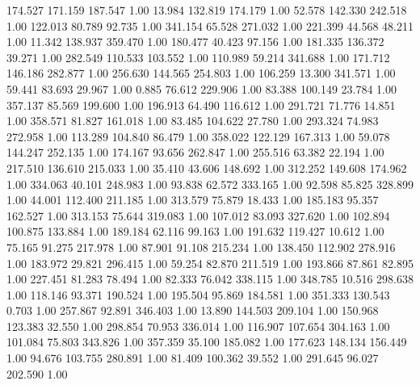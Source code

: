  174.527  171.159  187.547         1.00
  13.984  132.819  174.179         1.00
  52.578  142.330  242.518         1.00
 122.013   80.789   92.735         1.00
 341.154   65.528  271.032         1.00
 221.399   44.568   48.211         1.00
  11.342  138.937  359.470         1.00
 180.477   40.423   97.156         1.00
 181.335  136.372   39.271         1.00
 282.549  110.533  103.552         1.00
 110.989   59.214  341.688         1.00
 171.712  146.186  282.877         1.00
 256.630  144.565  254.803         1.00
 106.259   13.300  341.571         1.00
  59.441   83.693   29.967         1.00
   0.885   76.612  229.906         1.00
  83.388  100.149   23.784         1.00
 357.137   85.569  199.600         1.00
 196.913   64.490  116.612         1.00
 291.721   71.776   14.851         1.00
 358.571   81.827  161.018         1.00
  83.485  104.622   27.780         1.00
 293.324   74.983  272.958         1.00
 113.289  104.840   86.479         1.00
 358.022  122.129  167.313         1.00
  59.078  144.247  252.135         1.00
 174.167   93.656  262.847         1.00
 255.516   63.382   22.194         1.00
 217.510  136.610  215.033         1.00
  35.410   43.606  148.692         1.00
 312.252  149.608  174.962         1.00
 334.063   40.101  248.983         1.00
  93.838   62.572  333.165         1.00
  92.598   85.825  328.899         1.00
  44.001  112.400  211.185         1.00
 313.579   75.879   18.433         1.00
 185.183   95.357  162.527         1.00
 313.153   75.644  319.083         1.00
 107.012   83.093  327.620         1.00
 102.894  100.875  133.884         1.00
 189.184   62.116   99.163         1.00
 191.632  119.427   10.612         1.00
  75.165   91.275  217.978         1.00
  87.901   91.108  215.234         1.00
 138.450  112.902  278.916         1.00
 183.972   29.821  296.415         1.00
  59.254   82.870  211.519         1.00
 193.866   87.861   82.895         1.00
 227.451   81.283   78.494         1.00
  82.333   76.042  338.115         1.00
 348.785   10.516  298.638         1.00
 118.146   93.371  190.524         1.00
 195.504   95.869  184.581         1.00
 351.333  130.543    0.703         1.00
 257.867   92.891  346.403         1.00
  13.890  144.503  209.104         1.00
 150.968  123.383   32.550         1.00
 298.854   70.953  336.014         1.00
 116.907  107.654  304.163         1.00
 101.084   75.803  343.826         1.00
 357.359   35.100  185.082         1.00
 177.623  148.134  156.449         1.00
  94.676  103.755  280.891         1.00
  81.409  100.362   39.552         1.00
 291.645   96.027  202.590         1.00
